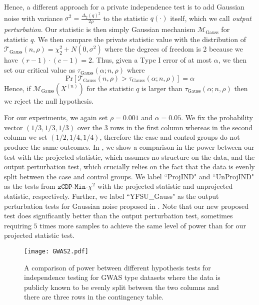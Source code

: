 \documentclass[twoside,letterpaper]{article} \usepackage{aistats2017}
\theoremstyle{definition}
\theoremstyle{remark}
\begin{document}
Hence, a different approach for a private independence test is to add Gaussian noise with variance $\sigma^2  = \frac{\Delta_2(q)^2}{2\rho}$ to the statistic $q(\cdot)$ itself, which we call \emph{output perturbation}.  Our statistic is then simply Gaussian mechanism ${{\mathcal{M}}_{\text{Gauss}}}$ for statistic $q$.  We then compare the private statistic value with the distribution of ${\mathcal{T}}_{\text{Gauss}}(n,\rho) = \chi^2_{2} + N\left(0,\sigma^2 \right)$ where the degrees of freedom is 2 because we have $(r-1)\cdot(c-1) = 2$.  Thus, given a Type I error of at most $\alpha$, we then set our critical value as $\tau_{\text{Gauss}}(\alpha;n,\rho)$ where
$$
 {\mathrm{Pr}\left[{{\mathcal{T}}_{\text{Gauss}}(n,\rho) > \tau_{\text{Gauss}}(\alpha;n,\rho)}\right]} = \alpha
$$
Hence, if ${{\mathcal{M}}_{\text{Gauss}}}({X^{({n})}})$ for the statistic $q$ is larger than $\tau_{\text{Gauss}}(\alpha;n,\rho)$ then we reject the null hypothesis.  

For our experiments, we again set $\rho = 0.001$ and $\alpha = 0.05$.  We fix the probability vector $(1/3,1/3,1/3)$ over the 3 rows in the first column whereas in the second column we set $(1/2,1/4,1/4)$, therefore the case and control groups do not produce the same outcomes.  In , we show a comparison in the power between our test with the projected statistic, which assumes no structure on the data, and the output perturbation test, which crucially relies on the fact that the data is evenly split between the case and control groups.  We label ``ProjIND" and ``UnProjIND" as the tests from ${\texttt{zCDP-Min-$\chi^2$}}$ with the projected statistic and unprojected statistic, respectively.  Further, we label ``YFSU\_Gauss" as the output perturbation tests for Gaussian noise proposed in \cite{YFSU14}.   Note that our new proposed test does significantly better than the output perturbation test, sometimes requiring $5$ times more samples to achieve the same level of power than for our projected statistic test.
\begin{figure}
\begin{center}
\texttt{[image: GWAS2.pdf]}
\end{center}
\caption{A comparison of power between different hypothesis tests for independence testing for GWAS type datasets where the data is publicly known to be evenly split between the two columns and there are three rows in the contingency table.\label{fig:GWAS}}
\end{figure}
\fi
\end{document}
